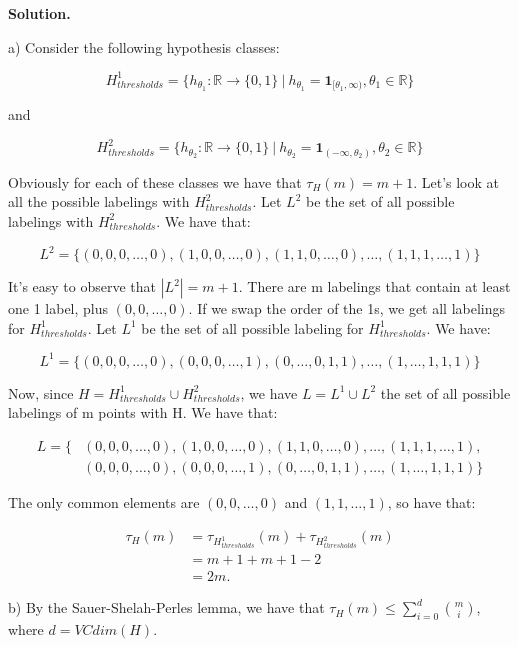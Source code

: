 \documentclass{article}
\newcommand{\<}{\langle}
\renewcommand{\>}{\rangle}
\theoremstyle{definition}
\begin{document}
\textbf{Solution.}

a) Consider the following hypothesis classes:

$$H_{thresholds}^{1} = \{h_{\theta_{1}} : \mathbb{R} \rightarrow \{0,1\} \ | \ h_{\theta_{1}} = \textbf{1}_{[\theta_1, \infty)}, \theta_1 \in \mathbb{R}\}$$

and

$$H_{thresholds}^{2} = \{h_{\theta_{2}} : \mathbb{R} \rightarrow \{0,1\} \ | \ h_{\theta_{2}} = \textbf{1}_{(-\infty, \theta_2)}, \theta_2 \in \mathbb{R}\}$$

Obviously for each of these classes we have that $\tau_H(m) = m + 1$. Let's look at all the possible labelings with $H_{thresholds}^{2}$. Let $L^2$ be the set of all possible labelings with $H_{thresholds}^{2}$. We have that:

$$L^2 = \{(0, 0, 0, \dots , 0), (1, 0, 0, \dots ,0), (1, 1, 0, \dots, 0), \dots, (1, 1, 1, \dots, 1)\}$$

It's easy to observe that $|L^2| = m + 1$. There are m labelings that contain at least one 1 label, plus $(0, 0, \dots, 0)$. If we swap the order of the 1s, we get all labelings for $H_{thresholds}^{1}$. Let $L^1$ be the set of all possible labeling for $H_{thresholds}^{1}$. We have:

$$L^1 = \{(0, 0, 0, \dots , 0), (0, 0, 0, \dots , 1), (0, \dots, 0, 1, 1), \dots, (1, \dots, 1, 1, 1)\}$$

Now, since $H = H_{thresholds}^{1} \cup H_{thresholds}^{2}$, we have $L = L^1 \cup L^2$ the set of all possible labelings of m points with H. We have that:

\[
\begin{aligned}
    L = \{& (0, 0, 0, \dots , 0), (1, 0, 0, \dots ,0), (1, 1, 0, \dots, 0), \dots, (1, 1, 1, \dots, 1), \\
    & (0, 0, 0, \dots , 0), (0, 0, 0, \dots , 1), (0, \dots, 0, 1, 1), \dots, (1, \dots, 1, 1, 1)\}
\end{aligned}
\]

The only common elements are $(0, 0, \dots, 0)$ and $(1, 1, \dots, 1)$, so have that:

\[
\begin{aligned}
    \tau_{H}(m) & = \tau_{H_{thresholds}^{1}}(m) + \tau_{H_{thresholds}^{2}}(m) \\
    & = m + 1 + m + 1 - 2 \\
    & = 2m.
\end{aligned}
\]

b) By the Sauer-Shelah-Perles lemma, we have that $\tau_H(m) \leq \sum_{i=0}^{d} {m \choose i}$, where $d = VCdim(H)$.
\end{document}
